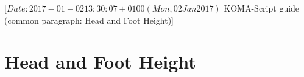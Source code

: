 %
%
%
%
%
%
%
%
% 
%
%
%
%

                 [$Date: 2017-01-02 13:30:07 +0100 (Mon, 02 Jan 2017) $
                  KOMA-Script guide (common paragraph: Head and Foot Height)]


\section{Head and Foot Height}
\BeginIndexGroup
{}%
%
%

